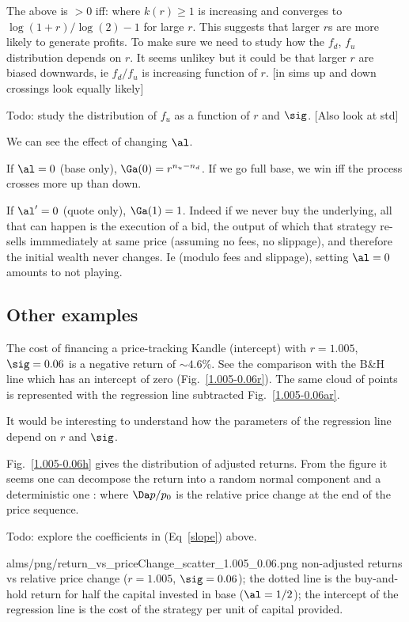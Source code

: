 \documentclass[oneside,12pt]{article}
\begin{document}
The above is $>0$ iff:
where $k(r)\geq 1$ is increasing and converges to $\log(1+r)/\log(2) -1$ for large $r$.
This suggests that  larger $r$s are more likely to generate profits. To make sure we need
to study how the $f_d$, $f_u$ distribution depends on $r$. It seems unlikey but it could be that larger $r$ are biased 
downwards, ie $f_d/f_u$ is increasing function of $r$. [in sims up and down crossings 
look equally likely]

Todo: study the distribution of $f_u$ as a function of $r$ and $\sig$. [Also look at std]

We can see the effect of changing $\al$.

If $\al=0$ (base only), $\Ga(0) = r^{n_u-n_d}$. If we go full base,
we win iff the process crosses more up than down.

If $\al'=0$ (quote only), $\Ga(1) = 1$. Indeed if we never buy the underlying,
all that can happen is the execution of a bid, 
the output of which that strategy re-sells immmediately at same price (assuming no fees, no slippage),
and therefore the initial wealth never changes. Ie (modulo fees and slippage), setting $\al=0$ amounts to not playing.


\subsection{Other examples}
The cost of financing a price-tracking Kandle (intercept) with $r=1.005$, $\sig=0.06$ is a negative return of 
$\sim 4.6\%$. See the comparison with the B\&H line which has an intercept of zero (Fig.~\ref{1.005-0.06r}).
The same cloud of points is represented with the regression line subtracted Fig.~\ref{1.005-0.06ar}.

It would be interesting to understand how the parameters of the regression line depend on $r$ and $\sig$.

Fig.~\ref{1.005-0.06h} gives the distribution of adjusted returns. 
From the figure it seems one can decompose the return into a random normal component
and a deterministic one      :
where $\Da p/p_0$ is the relative price change at the end of the price sequence.

Todo: explore the coefficients in (Eq~\ref{slope}) above.

\IG{420pt}
{alms/png/return_vs_priceChange_scatter_1.005_0.06.png}
{\label{1.005-0.06r} non-adjusted returns vs relative price change ($r=1.005$, $\sig=0.06$); the dotted line is the buy-and-hold
return for half the capital invested in base ($\al=1/2$); the intercept of the regression line 
is the cost of the strategy per unit of capital provided.}
\end{document}
